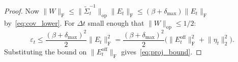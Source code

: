 \documentclass[10pt,a4paper]{amsart}
\newcommand{\fnorm}[1]{\lVert #1 \rVert_{\mathrm{F}}}
\newcommand{\norm}[1]{\lVert #1 \rVert}
\newcommand{\opnorm}[1]{\lVert #1 \rVert_{\mathrm{op}}}
\begin{document}
\begin{proof}
Now $\fnorm{W} \leq \opnorm{\widetilde{\Sigma}_t^{-1}}\fnorm{E_t} \leq (\beta + \delta_{\max})\fnorm{E_t}$ by~\eqref{eq:cov_lower}. For $\Delta t$ small enough that $\opnorm{W} \leq 1/2$:
\[
\varepsilon_t \leq \frac{(\beta+\delta_{\max})^2}{2}\fnorm{E_t}^2 = \frac{(\beta+\delta_{\max})^2}{2}\bigl(\fnorm{E_t^{\mathrm{off}}}^2 + \norm{\eta_t}_2^2\bigr).
\]
Substituting the bound on $\fnorm{E_t^{\mathrm{off}}}$ gives~\eqref{eq:proj_bound}.
\end{proof}
\end{document}
